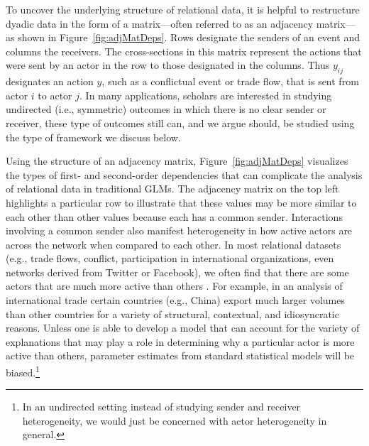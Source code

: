 To uncover the underlying structure of relational data, it is helpful to restructure dyadic data in the form of a matrix---often referred to as an adjacency matrix---as shown in Figure~\ref{fig:adjMatDeps}. Rows designate the senders of an event and columns the receivers. The cross-sections in this matrix represent the actions that were sent by an actor in the row to those designated in the columns. Thus $y_{ij}$ designates an action $y$, such as a conflictual event or trade flow, that is sent from actor $i$ to actor $j$. In many applications, scholars are interested in studying undirected (i.e., symmetric) outcomes in which there is no clear sender or receiver, these type of outcomes still can, and we argue should, be studied using the type of framework we discuss below.

Using the structure of an adjacency matrix, Figure~\ref{fig:adjMatDeps} visualizes the types of first- and second-order dependencies that can complicate the analysis of relational data in traditional GLMs. The adjacency matrix on the top left highlights a particular row to illustrate that these values may be more similar to each other than other values because each has a common sender. Interactions involving a common sender also manifest heterogeneity in how active actors are across the network when compared to each other. In most relational datasets (e.g., trade flows, conflict, participation in international organizations, even networks derived from Twitter or Facebook), we often find that there are some actors that are much more active than others \citep{barabasi:reka:1999}. For example, in an analysis of international trade certain countries (e.g., China) export much larger volumes than other countries for a variety of structural, contextual, and idiosyncratic reasons. Unless one is able to develop a model that can account for the variety of explanations that may play a role in determining why a particular actor is more active than others, parameter estimates from standard statistical models will be biased.\footnote{In an undirected setting instead of studying sender and receiver heterogeneity, we would just be concerned with actor heterogeneity in general.}

